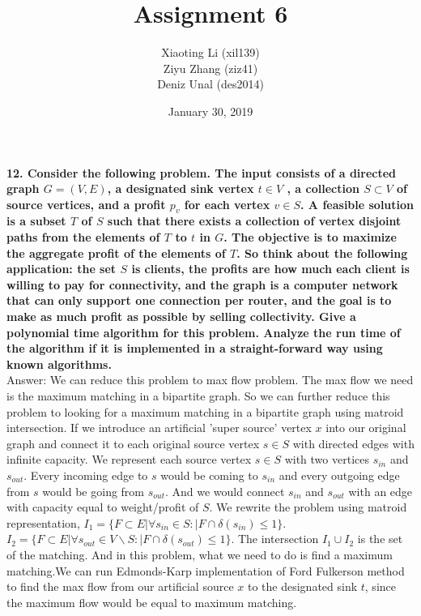 \documentclass{article}
\title{Assignment 6}
\author{Xiaoting Li (xil139) \\
Ziyu Zhang (ziz41) \\
Deniz Unal (des2014)}
\date{January 30, 2019}
\begin{document}
\maketitle

\noindent
\textbf{12. Consider the following problem. The input consists of a directed graph $G = (V, E)$, a designated sink vertex $t \in V$ , a collection $S \subset V$ of source vertices, and a profit $p_v$ for each vertex $v \in S$. A feasible solution is a subset $T$ of $S$ such that there exists a collection of vertex disjoint paths from the elements of $T$ to $t$ in $G$. The objective is to maximize the aggregate profit of the elements of $T$. So think about the following application: the set $S$ is clients, the profits are how much each client is willing to pay for connectivity, and the graph is a computer network that can only support one connection per router, and the goal is to make as much profit as possible by selling collectivity. Give a polynomial time algorithm for this problem. Analyze the run time of the algorithm if it is implemented in a straight-forward way using known algorithms.} \\ \newline
\noindent
Answer: We can reduce this problem to max flow problem. The max flow we need is the maximum matching in a bipartite graph. So we can further reduce this problem to looking for a maximum matching in a bipartite graph using matroid intersection. If we introduce an artificial 'super source' vertex $x$ into our original graph and connect it to each original source vertex $s \in S$ with  directed edges with infinite capacity. We represent each source vertex $s \in S$ with two vertices $s_{in}$ and $s_{out}$. Every incoming edge to $s$ would be coming to $s_{in}$  and every outgoing edge from $s$ would be going from $s_{out}$. And we would connect $s_{in}$ and $s_{out}$ with an edge with capacity equal to weight/profit of $S$. We rewrite the problem using matroid representation, $I_{1} = \{F\subset E | \forall s_{in} \in S: |F \cap \delta(s_{in})\leq 1\}$. $I_{2} = \{F\subset E | \forall s_{out} \in V\backslash S: |F \cap \delta(s_{out})\leq 1\}$. The intersection $I_{1}\cup I_{2}$ is the set of the matching. And in this problem, what we need to do is find a maximum matching.We can run Edmonds-Karp implementation of Ford Fulkerson method to find the max flow from our artificial source $x$ to the designated sink $t$, since the maximum flow would be equal to maximum matching.
\end{document}
